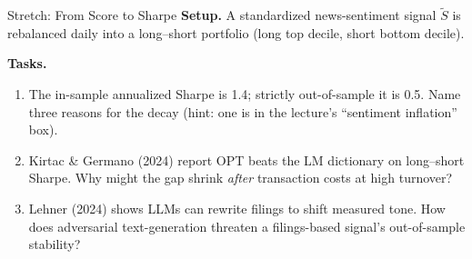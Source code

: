 \documentclass[9pt,t]{beamer}
\begin{document}
\begin{frame}[noframenumbering]{Stretch: From Score to Sharpe}
\textbf{Setup.} A standardized news-sentiment signal $\tilde S$ is rebalanced
daily into a long--short portfolio (long top decile, short bottom decile).

\medskip
\textbf{Tasks.}
\begin{enumerate}\small
  \item The in-sample annualized Sharpe is 1.4; strictly out-of-sample it is 0.5.
        Name three reasons for the decay (hint: one is in the lecture's
        ``sentiment inflation'' box).
  \item Kirtac \& Germano (2024) report OPT beats the LM dictionary on long--short
        Sharpe. Why might the gap shrink \emph{after} transaction costs at high turnover?
  \item Lehner (2024) shows LLMs can rewrite filings to shift measured tone.
        How does adversarial text-generation threaten a filings-based signal's
        out-of-sample stability?
\end{enumerate}
\end{frame}
\end{document}
